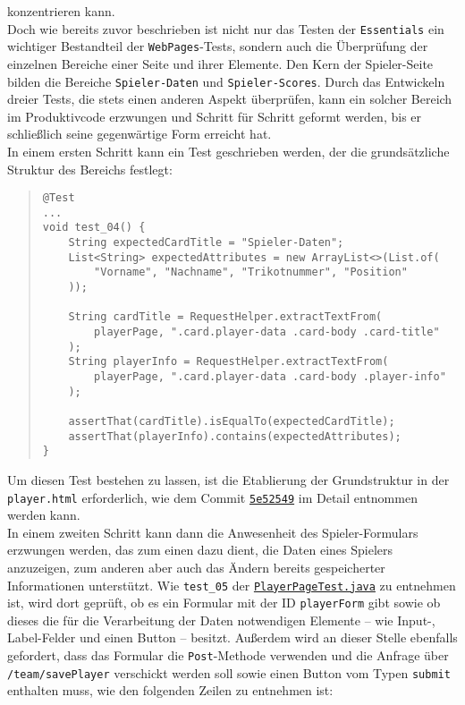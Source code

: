 konzentrieren kann. \\ 
Doch wie bereits zuvor beschrieben ist nicht nur das Testen der \texttt{Essentials} 
ein wichtiger Bestandteil der \texttt{WebPages}-Tests, sondern auch die Überprüfung 
der einzelnen Bereiche einer Seite und ihrer Elemente. Den Kern der Spieler-Seite 
bilden die Bereiche \texttt{Spieler-Daten} und \texttt{Spieler-Scores}. Durch das 
Entwickeln dreier Tests, die stets einen anderen Aspekt überprüfen, kann ein 
solcher Bereich im Produktivcode erzwungen und Schritt für Schritt geformt werden, 
bis er schließlich seine gegenwärtige Form erreicht hat. \\ 
In einem ersten Schritt kann ein Test geschrieben werden, der die grundsätzliche 
Struktur des Bereichs festlegt: 

\begin{quote}
\begin{verbatim}
@Test
...
void test_04() {
    String expectedCardTitle = "Spieler-Daten";
    List<String> expectedAttributes = new ArrayList<>(List.of(
        "Vorname", "Nachname", "Trikotnummer", "Position"
    ));

    String cardTitle = RequestHelper.extractTextFrom(
        playerPage, ".card.player-data .card-body .card-title"
    );
    String playerInfo = RequestHelper.extractTextFrom(
        playerPage, ".card.player-data .card-body .player-info"
    );

    assertThat(cardTitle).isEqualTo(expectedCardTitle);
    assertThat(playerInfo).contains(expectedAttributes);
}
\end{verbatim}
\end{quote}

Um diesen Test bestehen zu lassen, ist die Etablierung der Grundstruktur in der 
\texttt{player.html} erforderlich, wie dem Commit 
\href{https://github.com/FlorianOhmes/bat_spielzeitenplaner/commit/5e52549a16792f66ea818041bc364e6b3e5ac219}{\texttt{5e52549}}
im Detail entnommen werden kann. \\ 
In einem zweiten Schritt kann dann die Anwesenheit des Spieler-Formulars erzwungen 
werden, das zum einen dazu dient, die Daten eines Spielers anzuzeigen, zum anderen 
aber auch das Ändern bereits gespeicherter Informationen unterstützt. Wie 
\texttt{test\_05} der 
\href{https://github.com/FlorianOhmes/bat_spielzeitenplaner/blob/main/spielzeitenplaner/src/test/java/de/bathesis/spielzeitenplaner/templates/team/PlayerPageTest.java}{\texttt{PlayerPageTest.java}}
zu entnehmen ist, wird dort geprüft, ob es ein Formular mit der ID 
\texttt{playerForm} gibt sowie ob dieses die für die Verarbeitung der Daten 
notwendigen Elemente -- wie Input-, Label-Felder und einen Button -- besitzt. 
Außerdem wird an dieser Stelle ebenfalls gefordert, dass das Formular die 
\texttt{Post}-Methode verwenden und die Anfrage über \texttt{/team/savePlayer}
verschickt werden soll sowie einen Button vom Typen \texttt{submit} enthalten muss, 
wie den folgenden Zeilen zu entnehmen ist: 

